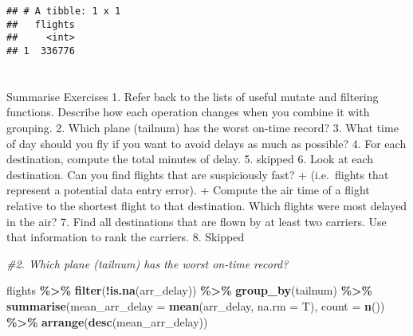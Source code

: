 \documentclass[
]{article}
\newenvironment{Shaded}{\begin{snugshade}}{\end{snugshade}}
\newcommand{\AttributeTok}[1]{\textcolor[rgb]{0.13,0.29,0.53}{#1}}
\newcommand{\CommentTok}[1]{\textcolor[rgb]{0.56,0.35,0.01}{\textit{#1}}}
\newcommand{\FunctionTok}[1]{\textcolor[rgb]{0.13,0.29,0.53}{\textbf{#1}}}
\newcommand{\NormalTok}[1]{#1}
\newcommand{\SpecialCharTok}[1]{\textcolor[rgb]{0.81,0.36,0.00}{\textbf{#1}}}
\begin{document}
\begin{verbatim}
## # A tibble: 1 x 1
##   flights
##     <int>
## 1  336776
\end{verbatim}

\hypertarget{section-4}{%
\section{}\label{section-4}}

\hypertarget{section-5}{%
\section{}\label{section-5}}

\hypertarget{section-6}{%
\section{}\label{section-6}}

Summarise Exercises 1. Refer back to the lists of useful mutate and
filtering functions. Describe how each operation changes when you
combine it with grouping. 2. Which plane (tailnum) has the worst on-time
record? 3. What time of day should you fly if you want to avoid delays
as much as possible? 4. For each destination, compute the total minutes
of delay. 5. skipped 6. Look at each destination. Can you find flights
that are suspiciously fast? + (i.e.~flights that represent a potential
data entry error). + Compute the air time of a flight relative to the
shortest flight to that destination. Which flights were most delayed in
the air? 7. Find all destinations that are flown by at least two
carriers. Use that information to rank the carriers. 8. Skipped

\begin{Shaded}
\begin{Highlighting}[]
\CommentTok{\#2. Which plane (tailnum) has the worst on{-}time record?}

\NormalTok{flights }\SpecialCharTok{\%\textgreater{}\%}
  \FunctionTok{filter}\NormalTok{(}\SpecialCharTok{!}\FunctionTok{is.na}\NormalTok{(arr\_delay)) }\SpecialCharTok{\%\textgreater{}\%}
  \FunctionTok{group\_by}\NormalTok{(tailnum) }\SpecialCharTok{\%\textgreater{}\%}
  \FunctionTok{summarise}\NormalTok{(}\AttributeTok{mean\_arr\_delay =} \FunctionTok{mean}\NormalTok{(arr\_delay, }\AttributeTok{na.rm =}\NormalTok{ T),}
            \AttributeTok{count =} \FunctionTok{n}\NormalTok{()) }\SpecialCharTok{\%\textgreater{}\%}
  \FunctionTok{arrange}\NormalTok{(}\FunctionTok{desc}\NormalTok{(mean\_arr\_delay))}
\end{Highlighting}
\end{Shaded}
\end{document}
